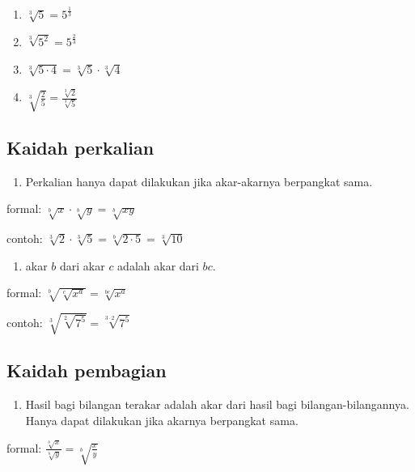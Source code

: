 \documentclass[
  letterpaper,
  DIV=11,
  numbers=noendperiod]{scrartcl}
\providecommand{\tightlist}{%
  \setlength{\itemsep}{0pt}\setlength{\parskip}{0pt}}\usepackage{longtable,booktabs,array}
\begin{document}
\begin{enumerate}
\def\labelenumi{\arabic{enumi}.}
\tightlist
\item
  \(\sqrt[3]{5}=5^{\frac{1}{3}}\)
\item
  \(\sqrt[3]{5^2}=5^{\frac{2}{3}}\)
\item
  \(\sqrt[3]{5 \cdot 4}=\sqrt[3]{5} \cdot \sqrt[3]{4}\)
\item
  \(\sqrt[3]{\frac{2}{5}}=\frac{\sqrt[3]{2}}{\sqrt[3]{5}}\)
\end{enumerate}

\subsection{Kaidah perkalian}\label{kaidah-perkalian}

\begin{enumerate}
\def\labelenumi{\arabic{enumi}.}
\setcounter{enumi}{4}
\tightlist
\item
  Perkalian hanya dapat dilakukan jika akar-akarnya berpangkat sama.
\end{enumerate}

formal: \(\sqrt[b]{x} \cdot \sqrt[b]{y}=\sqrt[b]{xy}\)

contoh:
\(\sqrt[3]{2} \cdot \sqrt[3]{5}=\sqrt[b]{2 \cdot 5}=\sqrt[3]{10}\)

\begin{enumerate}
\def\labelenumi{\arabic{enumi}.}
\setcounter{enumi}{5}
\tightlist
\item
  akar \(b\) dari akar \(c\) adalah akar dari \(bc\).
\end{enumerate}

formal: \(\sqrt[b]{\sqrt[c]{x^a}}=\sqrt[bc]{x^a}\)

contoh: \(\sqrt[3]{\sqrt[2]{7^5}}=\sqrt[3 \cdot 2]{7^5}\)

\subsection{Kaidah pembagian}\label{kaidah-pembagian}

\begin{enumerate}
\def\labelenumi{\arabic{enumi}.}
\setcounter{enumi}{7}
\tightlist
\item
  Hasil bagi bilangan terakar adalah akar dari hasil bagi
  bilangan-bilangannya. Hanya dapat dilakukan jika akarnya berpangkat
  sama.
\end{enumerate}

formal: \(\frac{\sqrt[b]{x}}{\sqrt[b]{y}}=\sqrt[b]{\frac{x}{y}}\)
\end{document}

